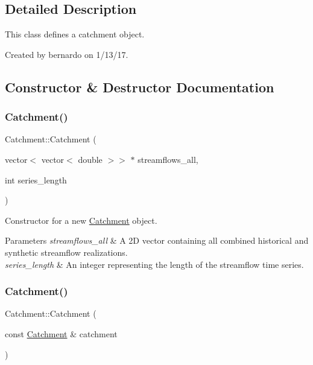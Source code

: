 \subsection{Detailed Description}
This class defines a catchment object. 

Created by bernardo on 1/13/17. 

\subsection{Constructor \& Destructor Documentation}
\mbox{\label{classCatchment_aafdee6ee868a8892314672abb119e60f}} 
\subsubsection{\texorpdfstring{Catchment()}{Catchment()}\hspace{0.1cm}{\footnotesize\ttfamily [1/2]}}
{\footnotesize\ttfamily Catchment\+::\+Catchment (\begin{DoxyParamCaption}\item[{vector$<$ vector$<$ double $>$$>$ $\ast$}]{streamflows\+\_\+all,  }\item[{int}]{series\+\_\+length }\end{DoxyParamCaption})}



Constructor for a new \mbox{\hyperlink{classCatchment}{Catchment}} object. 


\begin{DoxyParams}{Parameters}
{\em streamflows\+\_\+all} & A 2D vector containing all combined historical and synthetic streamflow realizations. \\
\hline
{\em series\+\_\+length} & An integer representing the length of the streamflow time series. \\
\hline
\end{DoxyParams}
\mbox{\label{classCatchment_ae311c4b2d857a8b5abc01f5317b04df2}} 
\subsubsection{\texorpdfstring{Catchment()}{Catchment()}\hspace{0.1cm}{\footnotesize\ttfamily [2/2]}}
{\footnotesize\ttfamily Catchment\+::\+Catchment (\begin{DoxyParamCaption}\item[{const \mbox{\hyperlink{classCatchment}{Catchment}} \&}]{catchment }\end{DoxyParamCaption})}



